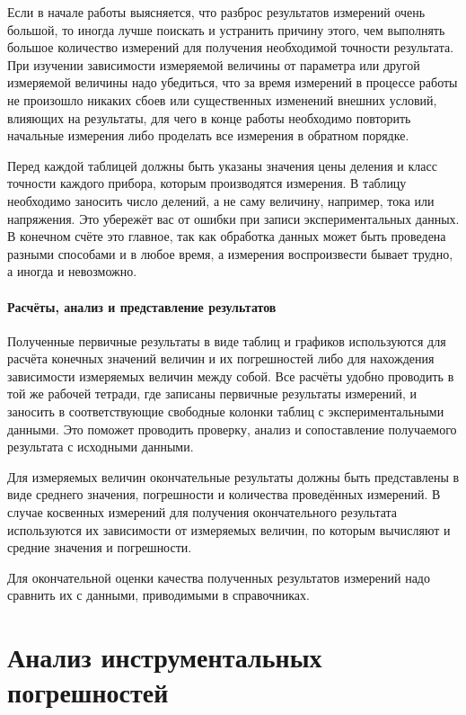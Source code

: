 Если в начале работы выясняется, что разброс результатов измерений
очень большой, то иногда лучше поискать и устранить причину этого,
чем выполнять большое количество измерений для получения необходимой
точности результата. При изучении зависимости измеряемой величины
от параметра или другой измеряемой величины надо убедиться, что за
время измерений в процессе работы не произошло никаких сбоев или существенных
изменений внешних условий, влияющих на результаты, для чего в конце
работы необходимо повторить начальные измерения либо проделать все
измерения в обратном порядке.

Перед каждой таблицей должны быть указаны значения цены деления и
класс точности каждого прибора, которым производятся измерения. В
таблицу необходимо заносить число делений, а не саму величину, например,
тока или напряжения. Это убережёт вас от ошибки при записи экспериментальных
данных. В конечном счёте это главное, так как обработка данных может
быть проведена разными способами и в любое время, а измерения воспроизвести
бывает трудно, а иногда и невозможно.%


\paragraph{Расчёты, анализ и представление результатов}

Полученные первичные результаты в виде таблиц и графиков используются
для расчёта конечных значений величин и их погрешностей либо для нахождения
зависимости измеряемых величин между собой. Все расчёты удобно проводить
в той же рабочей тетради, где записаны первичные результаты измерений,
и заносить в соответствующие свободные колонки таблиц с экспериментальными
данными. Это поможет проводить проверку, анализ и сопоставление получаемого
результата с исходными данными.

Для измеряемых величин окончательные результаты должны быть представлены
в виде среднего значения, погрешности и количества проведённых измерений.
В случае косвенных измерений для получения окончательного результата
используются их зависимости от измеряемых величин, по которым вычисляют
и средние значения и погрешности.

Для окончательной оценки качества полученных результатов измерений
надо сравнить их с данными, приводимыми в справочниках.%


\section{Анализ инструментальных погрешностей}

